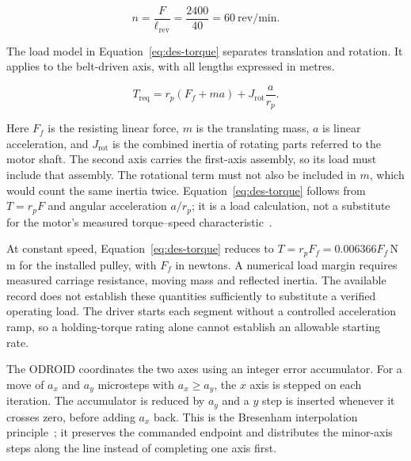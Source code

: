 \begin{equation}
n=\frac{F}{\ell_{\mathrm{rev}}}=\frac{2400}{40}=60\ \mathrm{rev/min}.
\label{eq:des-rpm}
\end{equation}

The load model in Equation~\ref{eq:des-torque} separates translation and rotation. It applies to the belt-driven axis, with all lengths expressed in metres.

\begin{equation}
T_{\mathrm{req}}=r_p(F_f+ma)+J_{\mathrm{rot}}\frac{a}{r_p}.
\label{eq:des-torque}
\end{equation}


Here $F_f$ is the resisting linear force, $m$ is the translating mass, $a$ is linear acceleration, and $J_{\mathrm{rot}}$ is the combined inertia of rotating parts referred to the motor shaft. The second axis carries the first-axis assembly, so its load must include that assembly. The rotational term must not also be included in $m$, which would count the same inertia twice. Equation~\ref{eq:des-torque} follows from $T=r_pF$ and angular acceleration $a/r_p$; it is a load calculation, not a substitute for the motor's measured torque--speed characteristic~\cite[page to verify]{acarnley2002}.

At constant speed, Equation~\ref{eq:des-torque} reduces to $T=r_pF_f=0.006366F_f$\,N\,m for the installed pulley, with $F_f$ in newtons. A numerical load margin requires measured carriage resistance, moving mass and reflected inertia. The available record does not establish these quantities sufficiently to substitute a verified operating load. The driver starts each segment without a controlled acceleration ramp, so a holding-torque rating alone cannot establish an allowable starting rate.

The ODROID coordinates the two axes using an integer error accumulator. For a move of $a_x$ and $a_y$ microsteps with $a_x\geq a_y$, the $x$ axis is stepped on each iteration. The accumulator is reduced by $a_y$ and a $y$ step is inserted whenever it crosses zero, before adding $a_x$ back. This is the Bresenham interpolation principle~\cite[p.~28]{bresenham1965}; it preserves the commanded endpoint and distributes the minor-axis steps along the line instead of completing one axis first.

